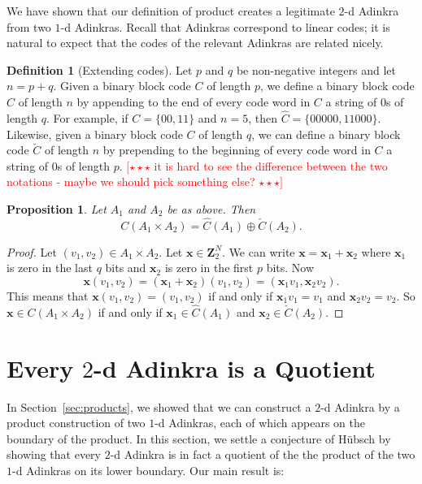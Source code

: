 \documentclass[12pt,twoside,singlespace]{article}
\numberwithin{equation}{section}
\newtheorem{prop}[equation]{Proposition}
\theoremstyle{definition}
\newtheorem{definition}[equation]{Definition}
\newcommand{\ZZ}{\mathbf{Z}}
\newcommand{\com}[1]{\textcolor{red}{$[\star \star \star$ #1 $\star \star \star]$}}
\renewcommand{\vec}[1]{\mathbf{#1}}
\begin{document}
We have shown that our definition of product creates a legitimate $2$-d Adinkra from two $1$-d Adinkras. Recall that Adinkras correspond to linear codes; it is natural to expect that the codes of the relevant Adinkras are related nicely.

\begin{definition}[Extending codes]
Let $p$ and $q$ be non-negative integers and let $n=p+q$. Given a binary block code $C$ of length $p$, we define a binary block code $\hat{C}$ of length $n$ by appending to the end of every code word in $C$ a string of $0$s of length $q$. For example, if $C = \{00, 11\}$ and $n = 5$, then $\hat{C} = \{00000, 11000\}$. Likewise, given a binary block code $C$ of length $q$, we can define a binary block code $\check{C}$ of length $n$ by prepending to the beginning of every code word in $C$ a string of $0$s of length $p$. \com{it is hard to see the difference between the two notations - maybe we should pick something else?}
\end{definition}

\begin{prop}
Let $A_1$ and $A_2$ be as above.  Then
\[C(A_1\times A_2)=\hat{C}(A_1)\oplus \check{C}(A_2).\]
\end{prop}
\begin{proof}
Let $(v_1,v_2)\in A_1\times A_2$.  Let $\vec{x}\in \ZZ_2^N$.  We can write $\vec{x}=\vec{x}_1+\vec{x}_2$ where $\vec{x}_1$ is zero in the last $q$ bits and $\vec{x}_2$ is zero in the first $p$ bits.  Now
\[\vec{x}(v_1,v_2)=(\vec{x}_1+\vec{x}_2)(v_1,v_2)=(\vec{x}_1v_1,\vec{x}_2v_2).\]
This means that $\vec{x}(v_1,v_2)=(v_1,v_2)$ if and only if $\vec{x}_1v_1=v_1$ and $\vec{x}_2 v_2=v_2$. So $\vec{x}\in C(A_1\times A_2)$ if and only if $\vec{x}_1\in \hat{C}(A_1)$ and $\vec{x}_2\in \check{C}(A_2)$.
\end{proof}





\section{Every $2$-d Adinkra is a Quotient}
\label{sec:quotient}

In Section~\ref{sec:products}, we showed that we can construct a $2$-d Adinkra by a product construction of two $1$-d Adinkras, each of which appears on the boundary of the product. In this section, we settle a conjecture of H\"ubsch \cite{hubsch:weaving} by showing that every $2$-d Adinkra is in fact a quotient of the the product of the two $1$-d Adinkras on its lower boundary. Our main result is:
\end{document}
